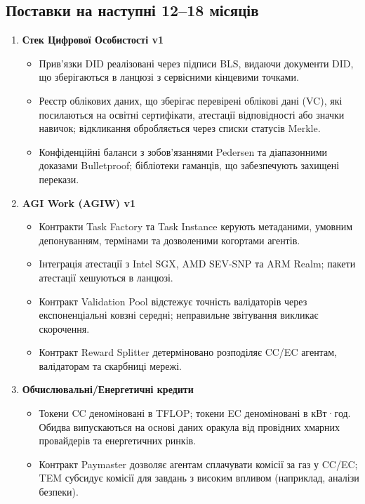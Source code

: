 \documentclass[11pt]{article}
\begin{document}
\subsection{Поставки на наступні 12--18 місяців}
\begin{enumerate}[label=\textbf{D\arabic*.}, leftmargin=*]
  \item \textbf{Стек Цифрової Особистості v1}
  \begin{itemize}[noitemsep]
    \item Прив'язки DID реалізовані через підписи BLS, видаючи документи DID, що зберігаються в ланцюзі з сервісними кінцевими точками.
    \item Реєстр облікових даних, що зберігає перевірені облікові дані (VC), які посилаються на освітні сертифікати, атестації відповідності або значки навичок; відкликання обробляється через списки статусів Merkle.
    \item Конфіденційні баланси з зобов'язаннями Pedersen та діапазонними доказами Bulletproof; бібліотеки гаманців, що забезпечують захищені перекази.
  \end{itemize}
  \item \textbf{AGI Work (AGIW) v1}
  \begin{itemize}[noitemsep]
    \item Контракти Task Factory та Task Instance керують метаданими, умовним депонуванням, термінами та дозволеними когортами агентів.
    \item Інтеграція атестації з Intel SGX, AMD SEV-SNP та ARM Realm; пакети атестації хешуються в ланцюзі.
    \item Контракт Validation Pool відстежує точність валідаторів через експоненціальні ковзні середні; неправильне звітування викликає скорочення.
    \item Контракт Reward Splitter детерміновано розподіляє CC/EC агентам, валідаторам та скарбниці мережі.
  \end{itemize}
  \item \textbf{Обчислювальні/Енергетичні кредити}
  \begin{itemize}[noitemsep]
    \item Токени CC деноміновані в TFLOP; токени EC деноміновані в кВт·год. Обидва випускаються на основі даних оракула від провідних хмарних провайдерів та енергетичних ринків.
    \item Контракт Paymaster дозволяє агентам сплачувати комісії за газ у CC/EC; TEM субсидує комісії для завдань з високим впливом (наприклад, аналізи безпеки).
  \end{itemize}

\end{enumerate}
\end{document}
